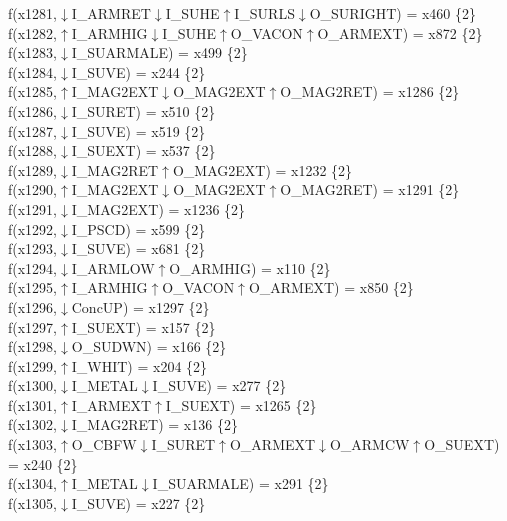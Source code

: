f(x1281,$\downarrow$I\_ARMRET$\downarrow$I\_SUHE$\uparrow$I\_SURLS$\downarrow$O\_SURIGHT) = x460 \{2\} \\  
f(x1282,$\uparrow$I\_ARMHIG$\downarrow$I\_SUHE$\uparrow$O\_VACON$\uparrow$O\_ARMEXT) = x872 \{2\} \\  
f(x1283,$\downarrow$I\_SUARMALE) = x499 \{2\} \\  
f(x1284,$\downarrow$I\_SUVE) = x244 \{2\} \\  
f(x1285,$\uparrow$I\_MAG2EXT$\downarrow$O\_MAG2EXT$\uparrow$O\_MAG2RET) = x1286 \{2\} \\  
f(x1286,$\downarrow$I\_SURET) = x510 \{2\} \\  
f(x1287,$\downarrow$I\_SUVE) = x519 \{2\} \\  
f(x1288,$\downarrow$I\_SUEXT) = x537 \{2\} \\  
f(x1289,$\downarrow$I\_MAG2RET$\uparrow$O\_MAG2EXT) = x1232 \{2\} \\  
f(x1290,$\uparrow$I\_MAG2EXT$\downarrow$O\_MAG2EXT$\uparrow$O\_MAG2RET) = x1291 \{2\} \\  
f(x1291,$\downarrow$I\_MAG2EXT) = x1236 \{2\} \\  
f(x1292,$\downarrow$I\_PSCD) = x599 \{2\} \\  
f(x1293,$\downarrow$I\_SUVE) = x681 \{2\} \\  
f(x1294,$\downarrow$I\_ARMLOW$\uparrow$O\_ARMHIG) = x110 \{2\} \\  
f(x1295,$\uparrow$I\_ARMHIG$\uparrow$O\_VACON$\uparrow$O\_ARMEXT) = x850 \{2\} \\  
f(x1296,$\downarrow$ConcUP) = x1297 \{2\} \\  
f(x1297,$\uparrow$I\_SUEXT) = x157 \{2\} \\  
f(x1298,$\downarrow$O\_SUDWN) = x166 \{2\} \\  
f(x1299,$\uparrow$I\_WHIT) = x204 \{2\} \\  
f(x1300,$\downarrow$I\_METAL$\downarrow$I\_SUVE) = x277 \{2\} \\  
f(x1301,$\uparrow$I\_ARMEXT$\uparrow$I\_SUEXT) = x1265 \{2\} \\  
f(x1302,$\downarrow$I\_MAG2RET) = x136 \{2\} \\  
f(x1303,$\uparrow$O\_CBFW$\downarrow$I\_SURET$\uparrow$O\_ARMEXT$\downarrow$O\_ARMCW$\uparrow$O\_SUEXT) = x240 \{2\} \\  
f(x1304,$\uparrow$I\_METAL$\downarrow$I\_SUARMALE) = x291 \{2\} \\  
f(x1305,$\downarrow$I\_SUVE) = x227 \{2\} \\  
